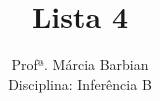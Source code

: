 \documentclass[10pt,brazil,addpoints]{exam}
\begin{document}
\title{Lista 4}


\author{
  Profª. Márcia Barbian \\
  Disciplina: Inferência B\\
  \date{}
}


\maketitle
\end{document}
